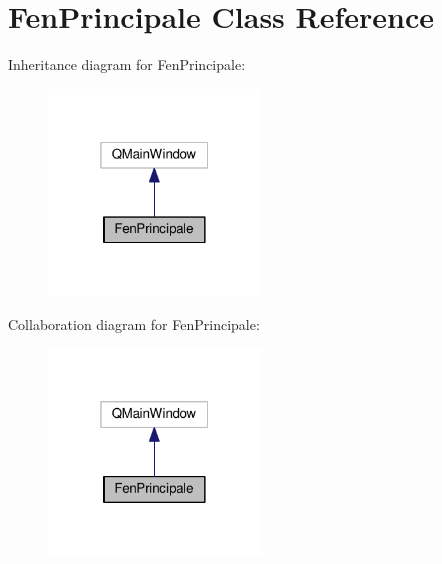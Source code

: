 \hypertarget{class_fen_principale}{}\section{Fen\+Principale Class Reference}
\label{class_fen_principale}


Inheritance diagram for Fen\+Principale\+:
\nopagebreak
\begin{figure}[H]
\begin{center}
\leavevmode
\includegraphics[width=160pt]{class_fen_principale__inherit__graph}
\end{center}
\end{figure}


Collaboration diagram for Fen\+Principale\+:
\nopagebreak
\begin{figure}[H]
\begin{center}
\leavevmode
\includegraphics[width=160pt]{class_fen_principale__coll__graph}
\end{center}
\end{figure}
